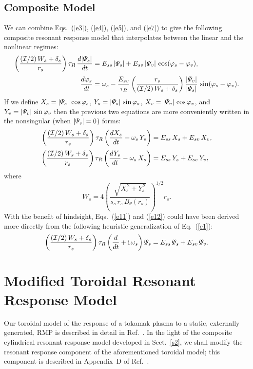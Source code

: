 \documentclass[12pt,prb,aps]{revtex4-1}
\begin{document}
\subsection{Composite Model}
We can combine Eqs.~(\ref{e3}), (\ref{e4}), (\ref{e5}), and (\ref{e7}) to give the following
composite resonant response model that interpolates between the linear and the nonlinear
regimes:
\begin{align}\label{e9}
\left(\frac{({\cal I}/2)\,W_s+\delta_s}{r_s}\right)\tau_R\,\frac{d|{\mit\Psi}_s|}{dt} &= E_{ss}\,|{\mit\Psi}_s| + E_{sv}\,|{\mit\Psi}_v|\,\cos(\varphi_s-\varphi_v),\\[0.5ex]
\frac{d\varphi_s}{dt}& = \omega_s - \frac{E_{sv}}{\tau_R}\left(\frac{r_s}{({\cal I}/2)\,W_s+\delta_s}\right)\frac{|{\mit\Psi}_v|}{|{\mit\Psi}_s|}\,\sin(\varphi_s-\varphi_v).\label{e10}
\end{align}
If we define $X_s = |{\mit\Psi}_s|\,\cos\varphi_s$, $Y_s = |{\mit\Psi}_s|\,\sin\varphi_s$, $X_v = |{\mit\Psi}_v|\,\cos\varphi_v$, and $Y_v = |{\mit\Psi}_v|\,\sin\varphi_v$ 
then the previous two equations are more conveniently written in the nonsingular (when $|{\mit\Psi}_s|=0$) forms:\,\cite{slip1,slip2,slip3}
\begin{align}\label{e11}
\left(\frac{({\cal I}/2)\,W_s+\delta_s}{r_s}\right)\tau_R\left(\frac{dX_s}{dt}+\omega_s\,Y_s\right)&= E_{ss}\,X_s + E_{sv}\,X_v,\\[0.5ex]
\left(\frac{({\cal I}/2)\,W_s+\delta_s}{r_s}\right)\tau_R\left(\frac{dY_s}{dt}-\omega_s\,X_s\right)& = E_{ss}\,Y_s + E_{sv}\,Y_v,\label{e12}
\end{align}
where
\begin{equation}\label{e23x}
W_s = 4\left(\frac{\sqrt{X_s^{\,2}+Y_s^{\,2}}}{s_s\,r_s\,B_\theta(r_s)}\right)^{1/2} r_s.
\end{equation}
With the benefit of hindsight, Eqs.~(\ref{e11}) and (\ref{e12}) could have been derived more directly from the
following heuristic generalization of Eq.~(\ref{e1}):\,\cite{slip2}
\begin{equation}
\left(\frac{({\cal I}/2)\,W_s+\delta_s}{r_s}\right)\tau_R\left(\frac{d}{dt}+{\rm i}\,\omega_s\right){\mit\Psi}_s= E_{ss}\,{\mit\Psi}_s+E_{sv}\,{\mit\Psi}_v.
\end{equation}

\section{Modified Toroidal Resonant Response Model}\label{s3}
Our toroidal model of the response of a tokamak plasma to a static, externally generated, RMP is described in
detail in Ref.~. In the light of the composite cylindrical resonant response model developed in Sect.~\ref{s2}, we shall
modify the resonant  response component of the aforementioned toroidal  model; this component is described in Appendix~D of Ref.~.
\end{document}
